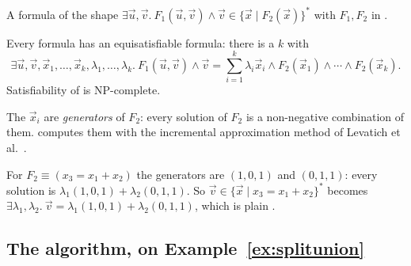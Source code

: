 \begin{definition}[\liastar{}]
A formula of the shape
$\exists \vec u,\vec v.\ F_1(\vec u,\vec v) \wedge \vec v \in \{\vec x \mid F_2(\vec x)\}^*$
with $F_1,F_2$ in \lia{}.
\end{definition}


\begin{theorem}\label{thm:liastar}
Every \liastar{} formula has an equisatisfiable \lia{} formula: there is a $k$ with
\[
\exists \vec u,\vec v,\vec x_1,\dots,\vec x_k,\lambda_1,\dots,\lambda_k.\
F_1(\vec u,\vec v)\wedge \vec v=\sum_{i=1}^{k}\lambda_i\vec x_i \wedge F_2(\vec x_1)\wedge\cdots\wedge F_2(\vec x_k).
\]
Satisfiability of \liastar{} is NP-complete.
\end{theorem}

The $\vec x_i$ are \emph{generators} of $F_2$: every solution of $F_2$ is a non-negative
combination of them. \sqlsolver{} computes them with the incremental approximation method
of Levatich et al.~\cite{levatich}.

\begin{example}
For $F_2 \equiv (x_3=x_1+x_2)$ the generators are $(1,0,1)$ and $(0,1,1)$: every solution is
$\lambda_1(1,0,1)+\lambda_2(0,1,1)$. So
$\vec v\in\{\vec x\mid x_3=x_1+x_2\}^*$ becomes
$\exists\lambda_1,\lambda_2.\ \vec v=\lambda_1(1,0,1)+\lambda_2(0,1,1)$, which is plain \lia{}.
\end{example}

\subsection{The algorithm, on Example~\ref{ex:splitunion}}

